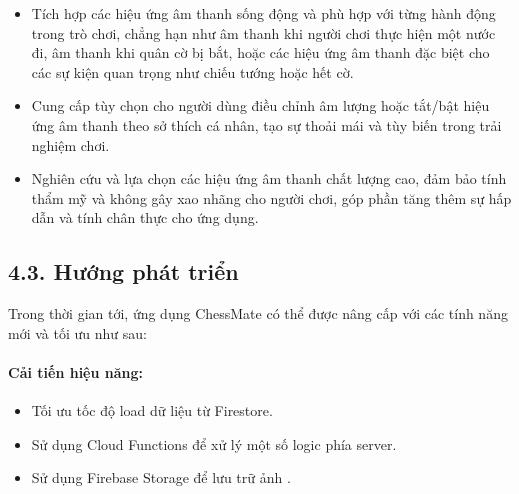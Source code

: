 \documentclass[a4paper,12pt]{article}
\begin{document}
\begin{itemize}[label=·]
\begin{itemize}[label=$\circ$]
        \item Tích hợp các hiệu ứng âm thanh sống động và phù hợp với từng hành động trong trò chơi, chẳng hạn như âm thanh khi người chơi thực hiện một nước đi, âm thanh khi quân cờ bị bắt, hoặc các hiệu ứng âm thanh đặc biệt cho các sự kiện quan trọng như chiếu tướng hoặc hết cờ.
        \item Cung cấp tùy chọn cho người dùng điều chỉnh âm lượng hoặc tắt/bật hiệu ứng âm thanh theo sở thích cá nhân, tạo sự thoải mái và tùy biến trong trải nghiệm chơi.
        \item Nghiên cứu và lựa chọn các hiệu ứng âm thanh chất lượng cao, đảm bảo tính thẩm mỹ và không gây xao nhãng cho người chơi, góp phần tăng thêm sự hấp dẫn và tính chân thực cho ứng dụng.
    \end{itemize}
\end{itemize}

\subsection*{4.3. Hướng phát triển} %

\justify
\noindent Trong thời gian tới, ứng dụng ChessMate có thể được nâng cấp với các tính năng mới và tối ưu như sau:

\paragraph{\textbf{Cải tiến hiệu năng:}} %
\begin{itemize}[label=·]
    \item Tối ưu tốc độ load dữ liệu từ Firestore.
    \item Sử dụng Cloud Functions để xử lý một số logic phía server.
    \item Sử dụng Firebase Storage để lưu trữ ảnh .
\end{itemize}
\end{document}
